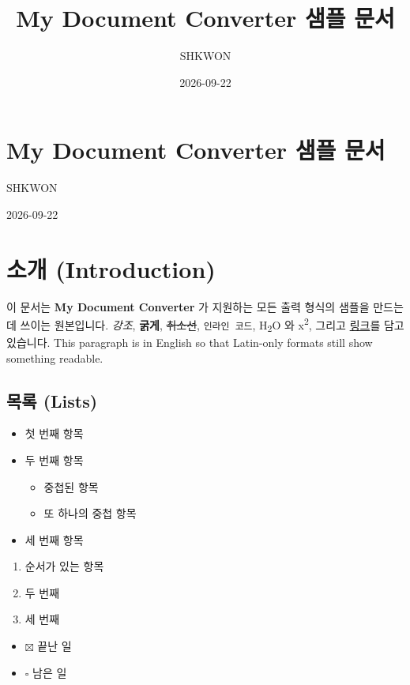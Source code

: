 \documentclass[11pt]{article}
\title{My Document Converter 샘플 문서}
\author{SHKWON}
\date{2026-09-22}
\begin{document}
\maketitle

\section*{My Document Converter 샘플 문서}\label{my-document-converter-샘플-문서}

SHKWON

2026-09-22

\section*{소개 (Introduction)}\label{소개-introduction}

이 문서는 \textbf{My Document Converter} 가 지원하는 모든 출력 형식의 샘플을 만드는 데 쓰이는
원본입니다. \emph{강조}, \textbf{굵게}, \sout{취소선}, \verb|인라인 코드|,
H\textsubscript{2}O 와 x\textsuperscript{2}, 그리고
\href{https://example.com}{링크}를 담고 있습니다. This paragraph is in English so
that Latin-only formats still show something readable.

\subsection*{목록 (Lists)}\label{목록-lists}

\begin{itemize}
\item 첫 번째 항목
\item 두 번째 항목
\begin{itemize}
\item 중첩된 항목
\item 또 하나의 중첩 항목
\end{itemize}
\item 세 번째 항목
\end{itemize}

\begin{enumerate}
\item 순서가 있는 항목
\item 두 번째
\item 세 번째
\end{enumerate}

\begin{itemize}
\item $\boxtimes$ 끝난 일
\item $\square$ 남은 일
\end{itemize}
\end{document}
